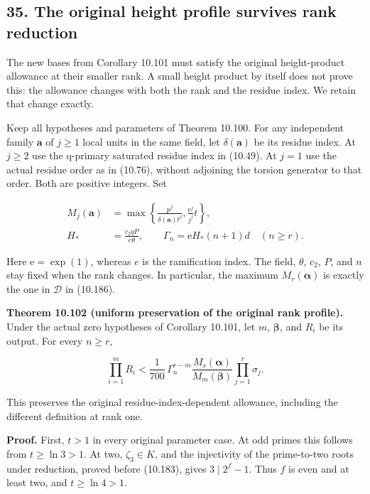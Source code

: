\documentclass[
  11pt,
  a4paper,
]{article}
\begin{document}
\subsection{35. The original height profile survives rank
reduction}\label{the-original-height-profile-survives-rank-reduction}

The new bases from Corollary 10.101 must satisfy the original
height-product allowance at their smaller rank. A small height product
by itself does not prove this: the allowance changes with both the rank
and the residue index. We retain that change exactly.

Keep all hypotheses and parameters of Theorem 10.100. For any
independent family \(\boldsymbol a\) of \(j\ge1\) local units in the
same field, let \(\delta(\boldsymbol a)\) be its residue index. At
\(j\ge2\) use the q-primary saturated residue index in (10.49). At
\(j=1\) use the actual residue order as in (10.76), without adjoining
the torsion generator to that order. Both are positive integers. Set

\[
\begin{aligned}
M_j(\boldsymbol a)
&=\max\left\{\frac{p^f}{\delta(\boldsymbol a)t^j},
                 \frac{\mathrm e^j}{j^j}t\right\},\\
H_*&=\frac{c_2qP}{e\theta},\qquad
\Gamma_n=\mathrm e H_*(n+1)d\quad(n\ge r).
\end{aligned}
\tag{10.272}
\]

Here \(\mathrm e=\exp(1)\), whereas \(e\) is the ramification index. The
field, \(\theta\), \(c_2\), \(P\), and \(n\) stay fixed when the rank
changes. In particular, the maximum \(M_r(\boldsymbol\alpha)\) is
exactly the one in \(\mathcal D\) in (10.186).

\textbf{Theorem 10.102 (uniform preservation of the original rank
profile).} Under the actual zero hypotheses of Corollary 10.101, let
\(m\), \(\boldsymbol\beta\), and \(R_i\) be its output. For every
\(n\ge r\),

\[
\prod_{i=1}^m R_i
<\frac1{700}\,
\Gamma_n^{r-m}
\frac{M_r(\boldsymbol\alpha)}{M_m(\boldsymbol\beta)}
\prod_{j=1}^r\sigma_j.
\tag{10.273}
\]

This preserves the original residue-index-dependent allowance, including
the different definition at rank one.

\textbf{Proof.} First, \(t>1\) in every original parameter case. At odd
primes this follows from \(t\ge\ln3>1\). At two, \(\zeta_3\in K\), and
the injectivity of the prime-to-two roots under reduction, proved before
(10.183), gives \(3\mid2^f-1\). Thus \(f\) is even and at least two, and
\(t\ge\ln4>1\).
\end{document}
